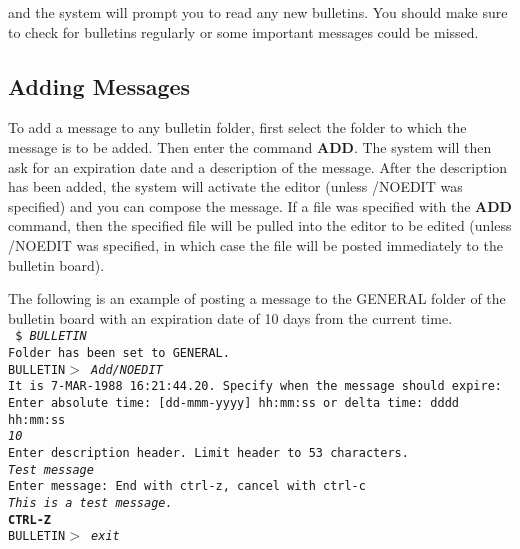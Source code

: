 and the system will prompt you to read any new bulletins.
You should make sure to check for bulletins regularly or some important
messages could be missed.
 
\subsection{Adding Messages}
 
To add a message to any bulletin folder, first select the folder to which the
message is to be added.  Then enter the command {\bf ADD}.  The system will
then ask for an expiration date and a description of the message.   After the
description has been added, the system will activate the editor (unless /NOEDIT
was specified) and you can compose the message.  If a file was specified
with the {\bf ADD} command, then the specified file will be pulled into the
editor to be edited (unless /NOEDIT was specified, in which case the file will
be posted immediately to the bulletin board).
 
The following is an example of posting a message to the GENERAL folder of the
bulletin board with an expiration date of 10 days from the current time.\\[1em]
\noindent
{\smaller \tt
\$ {\it BULLETIN}\CR \\[.5em]
Folder has been set to GENERAL.\\
BULLETIN$>$ {\it Add/NOEDIT} \CR \\
It is  7-MAR-1988 16:21:44.20. Specify when the message should expire:\\
Enter absolute time: [dd-mmm-yyyy] hh:mm:ss or delta time: dddd hh:mm:ss\\
{\it 10}\CR \\
Enter description header.  Limit header to 53 characters.\\
{\it Test message}\CR \\
Enter message: End with ctrl-z, cancel with ctrl-c\\
{\it This is a test message.}\CR \\
{\bf CTRL-Z }\\
BULLETIN$>$ {\it exit}\CR \\
}
